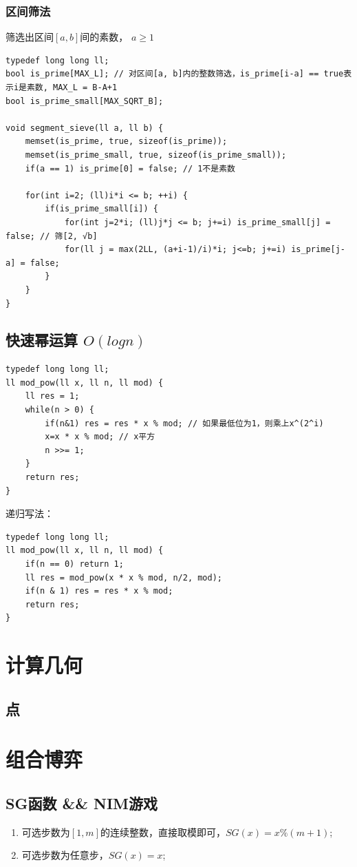 \documentclass[a4paper]{ctexrep}
\begin{document}
\subsection{区间筛法}
筛选出区间$[a, b]$间的素数， $a \ge 1$

\begin{lstlisting}
typedef long long ll;
bool is_prime[MAX_L]; // 对区间[a, b]内的整数筛选，is_prime[i-a] == true表示i是素数, MAX_L = B-A+1
bool is_prime_small[MAX_SQRT_B]; 

void segment_sieve(ll a, ll b) {
	memset(is_prime, true, sizeof(is_prime)); 
	memset(is_prime_small, true, sizeof(is_prime_small));
	if(a == 1) is_prime[0] = false; // 1不是素数

	for(int i=2; (ll)i*i <= b; ++i) {
		if(is_prime_small[i]) {
			for(int j=2*i; (ll)j*j <= b; j+=i) is_prime_small[j] = false; // 筛[2, √b]
			for(ll j = max(2LL, (a+i-1)/i)*i; j<=b; j+=i) is_prime[j-a] = false;
		}
	}
}
\end{lstlisting}

\section{快速幂运算 $O(log n)$}
\begin{lstlisting}
typedef long long ll;
ll mod_pow(ll x, ll n, ll mod) {
	ll res = 1;
	while(n > 0) {
		if(n&1) res = res * x % mod; // 如果最低位为1，则乘上x^(2^i)
		x=x * x % mod; // x平方
		n >>= 1;
	}
	return res;
}
\end{lstlisting}

递归写法：
\begin{lstlisting}
typedef long long ll;
ll mod_pow(ll x, ll n, ll mod) {
	if(n == 0) return 1;
	ll res = mod_pow(x * x % mod, n/2, mod);
	if(n & 1) res = res * x % mod;
	return res;
}
\end{lstlisting}

\chapter{计算几何}
\section{点}


\chapter{组合博弈}
\section{SG函数 \&\& NIM游戏}
\begin{enumerate}
	\item 可选步数为$[1, m]$的连续整数，直接取模即可，$SG(x)=x\%(m+1)$;
	\item 可选步数为任意步，$SG(x)=x$;
\end{enumerate}
\end{document}

